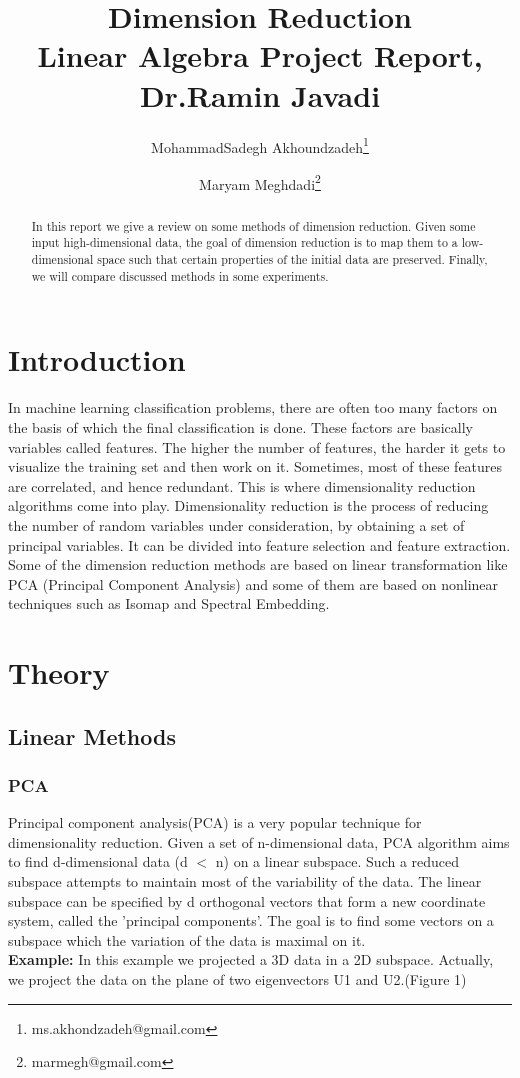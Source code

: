 \documentclass[a4paper]{article}
\title{\textbf{Dimension Reduction}\\ \large Linear Algebra Project Report, Dr.Ramin Javadi}
\author[1]{MohammadSadegh Akhoundzadeh\thanks{ms.akhondzadeh@gmail.com}}
\author[1]{Maryam Meghdadi\thanks{marmegh@gmail.com}}
\affil[1]{Department of Electrical and Computer Engineering, Isfahan University of Technology
}
\begin{document}
\maketitle

\begin{abstract}
In this report we give a review on some methods of dimension reduction. Given some input high-dimensional data, the goal of dimension reduction is to map them to a low-dimensional space such that certain properties of the initial data are preserved. Finally, we will compare discussed methods in some experiments.
\end{abstract}

\section{Introduction}
\label{sec:introduction}

In machine learning classification problems, there are often too many factors on the basis of which the final classification is done. These factors are basically variables called features. The higher the number of features, the harder it gets to visualize the training set and then work on it. Sometimes, most of these features are correlated, and hence redundant. This is where dimensionality reduction algorithms come into play. Dimensionality reduction is the process of reducing the number of random variables under consideration, by obtaining a set of principal variables. It can be divided into feature selection and feature extraction.
Some of the dimension reduction methods are based on linear transformation like PCA (Principal Component Analysis) and some of them are based on nonlinear techniques such as Isomap and Spectral Embedding.
\section{Theory}
\label{sec:theory}

\subsection{Linear Methods}

\subsubsection{PCA}
Principal component analysis(PCA) is a very popular technique for dimensionality reduction. Given a set of n-dimensional data, PCA algorithm aims to find d-dimensional data (d $<$ n) on a linear subspace. Such a reduced subspace
attempts to maintain most of the variability of the data. The linear subspace can be specified by d orthogonal vectors that form a new coordinate
system, called the 'principal components'. The goal is to find some vectors on a subspace which the variation of the data is maximal on it.\\
\textbf{Example:} In this example we projected a 3D data in a 2D subspace. Actually, we project the data on the plane of two eigenvectors U1 and U2.(Figure 1)\\
\end{document}
